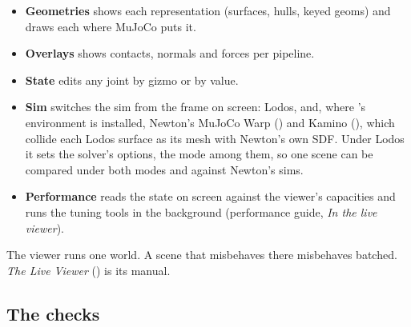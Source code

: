 \begin{itemize}
\item \textbf{Geometries} shows each representation (surfaces, hulls, keyed geoms) and draws each where MuJoCo puts it.
\item \textbf{Overlays} shows contacts, normals and forces per pipeline.
\item \textbf{State} edits any joint by gizmo or by value.
\item \textbf{Sim} switches the sim from the frame on screen: Lodos, and, where 's environment is installed, Newton's MuJoCo Warp () and Kamino (), which collide each Lodos surface as its mesh with Newton's own SDF. Under Lodos it sets the solver's options, the mode among them, so one scene can be compared under both modes and against Newton's sims.
\item \textbf{Performance} reads the state on screen against the viewer's capacities and runs the tuning tools in the background (performance guide, \emph{In the live viewer}).
\end{itemize}

The viewer runs one world. A scene that misbehaves there misbehaves batched. \emph{The Live Viewer} () is its manual.

\subsection{The checks}\label{sec:checks}

